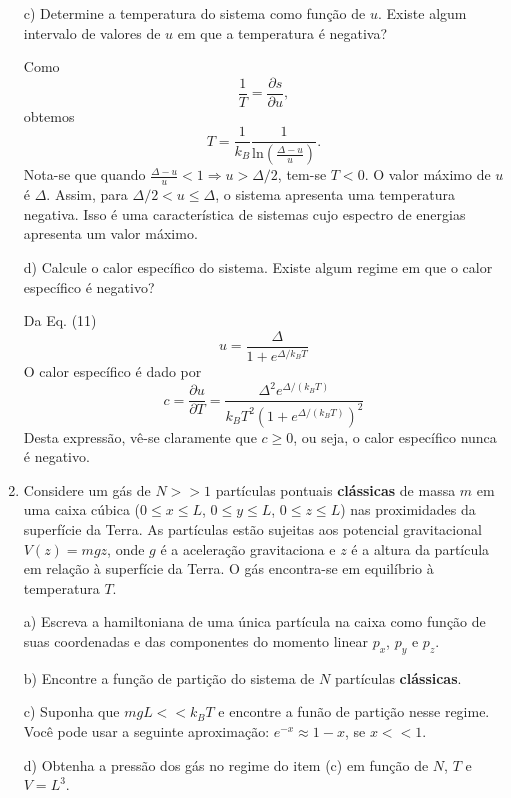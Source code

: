 \begin{enumerate}[start=1,label={\bfseries Q\arabic*.}]
c) Determine a temperatura do sistema como função de $u$. Existe algum intervalo de valores de $u$ em  que a temperatura é negativa?

\resposta Como
$$
\frac{1}{T} = \frac{\partial s}{\partial u},
$$
obtemos
$$
T = \frac{1}{k_{B}} \frac{1}{\mathrm{ln} \left( \frac{\Delta - u}{u} \right)}.
$$
Nota-se que quando $\frac{\Delta - u}{u} < 1 \Rightarrow u > \Delta /2$, tem-se $T < 0$. O valor máximo de $u$ é $\Delta$. Assim, para $\Delta/2 < u \leq \Delta$, o sistema apresenta uma temperatura negativa. Isso é uma característica de sistemas cujo espectro de energias apresenta um valor máximo.


d) Calcule o calor específico do sistema. Existe algum regime em que o calor específico é negativo?

\resposta Da Eq. (11)
$$
u = \frac{\Delta}{1+e^{\Delta/k_{B}T}}
$$
O calor específico é dado por
$$
c=\frac{\partial u}{\partial T}=\frac{\Delta^{2} e^{\Delta /\left(k_{B} T\right)}}{k_{B} T^{2}\left(1+e^{\Delta /\left(k_{B} T\right)}\right)^{2}}
$$
Desta expressão, vê-se claramente que $c \geq 0$, ou seja, o calor específico nunca é negativo.





\item Considere um gás de $N >> 1$ partículas pontuais \textbf{clássicas} de massa $m$ em uma caixa cúbica ($0 \leq x \leq L$, $0 \leq y \leq L$, $0 \leq z \leq L$) nas proximidades da superfície da Terra. As partículas estão sujeitas aos potencial gravitacional $V(z) = mgz$, onde $g$ é a aceleração gravitaciona e $z$ é a altura da partícula em relação à superfície da Terra. O gás encontra-se em equilíbrio à temperatura $T$.



  a) Escreva a hamiltoniana de uma única partícula na caixa como função de suas coordenadas e das componentes do momento linear $p_{x}$, $p_{y}$ e $p_{z}$.

  \resposta

  b) Encontre a função de partição do sistema de $N$ partículas \textbf{clássicas}.

  \resposta

  c) Suponha que $mgL << k_{B}T$ e encontre a funão de partição nesse regime. Você pode usar a seguinte aproximação: $e^{-x} \approx 1 - x$, se $x << 1$.

  \resposta

  d) Obtenha a pressão dos gás no regime do item (c) em função de $N$, $T$ e $V = L^{3}$.


\end{enumerate}
